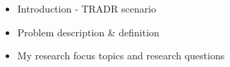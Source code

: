 \begin{itemize}
\item Introduction - TRADR scenario
\item Problem description & definition 
\item My research focus topics and research questions
\end{itemize}

    
    
    